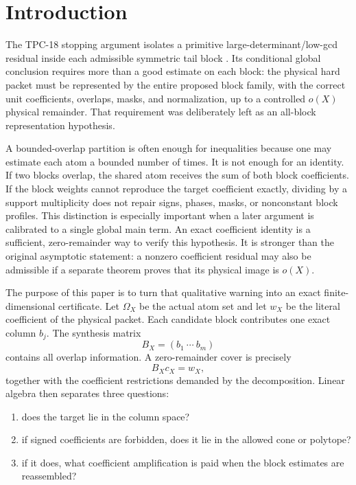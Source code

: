 \section{Introduction}
\label{sec:introduction}

The TPC-18 stopping argument isolates a primitive
large-determinant/low-gcd residual inside each admissible symmetric
tail block \citep{WangTPC18}.  Its conditional global conclusion
requires more than a good estimate on each block: the physical hard
packet must be represented by the entire proposed block family, with
the correct unit coefficients, overlaps, masks, and normalization, up
to a controlled \(o(X)\) physical remainder.  That requirement was
deliberately left as an all-block representation hypothesis.

A bounded-overlap partition is often enough for inequalities because
one may estimate each atom a bounded number of times.  It is not
enough for an identity.  If two blocks overlap, the shared atom
receives the sum of both block coefficients.  If the block weights
cannot reproduce the target coefficient exactly, dividing by a
support multiplicity does not repair signs, phases, masks, or
nonconstant block profiles.  This distinction is especially important
when a later argument is calibrated to a single global main term.
An exact coefficient identity is a sufficient, zero-remainder way to
verify this hypothesis.  It is stronger than the original asymptotic
statement: a nonzero coefficient residual may also be admissible if a
separate theorem proves that its physical image is \(o(X)\).

The purpose of this paper is to turn that qualitative warning into an
exact finite-dimensional certificate.  Let \(\Omega_X\) be the actual
atom set and let \(w_X\) be the literal coefficient of the physical
packet.  Each candidate block contributes one exact column \(b_j\).
The synthesis matrix
\[
 B_X=(b_1\ \cdots\ b_m)
\]
contains all overlap information.  A zero-remainder cover is precisely
\[
 B_Xc_X=w_X,
\]
together with the coefficient restrictions demanded by the
decomposition.  Linear algebra then separates three questions:
\begin{enumerate}[label=(\roman*),leftmargin=2.2em]
\item does the target lie in the column space?
\item if signed coefficients are forbidden, does it lie in the
  allowed cone or polytope?
\item if it does, what coefficient amplification is paid when the
  block estimates are reassembled?
\end{enumerate}

